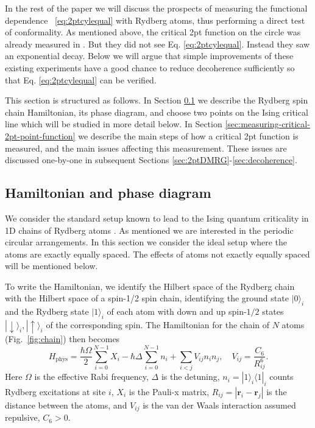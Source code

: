 \documentclass[a4paper,11pt]{article}
\theoremstyle{remark}
\theoremstyle{theorem}
\begin{document}
In the rest of the paper we will discuss the prospects of measuring the
functional dependence ~\eqref{eq:2ptcylequal} with Rydberg atoms, thus
performing a direct test of conformality. As mentioned above, the critical 2pt
function on the circle was already measured in
{\cite{Fang:2024uyf,Emperauger:2025raf}}. But they did not see Eq.
\eqref{eq:2ptcylequal}. Instead they saw an exponential decay. Below we will
argue that simple improvements of these existing experiments have a good
chance to reduce decoherence sufficiently so that Eq. \eqref{eq:2ptcylequal}
can be verified.

This section is structured as follows. In Section \ref{sec:hamiltonian-and-phase-diagram} we describe the Rydberg spin chain Hamiltonian, its phase diagram, and choose two points on the Ising critical line which will be studied in more detail below. In Section \ref{sec:measuring-critical-2pt-point-function} we describe the main steps of how a critical 2pt function is measured, and the main issues affecting this measurement. These issues are discussed one-by-one in subsequent Sections \ref{sec:2ptDMRG}-\ref{sec:decoherence}. 

\subsection{Hamiltonian and phase diagram}\label{sec:hamiltonian-and-phase-diagram}

We consider the standard setup known to lead to the Ising quantum criticality in
1D chains of Rydberg atoms {\cite[Eq.~(1)]{Browaeys:2020kzz}}. As mentioned we
are interested in the periodic circular arrangements. In this section we
consider the ideal setup where the atoms are exactly equally spaced. The
effects of atoms not exactly equally spaced will be mentioned below.

To write the Hamiltonian, we identify the Hilbert space of the Rydberg chain
with the Hilbert space of a spin-1/2 spin chain, identifying the ground state
$|0\rangle_i$ and the Rydberg state $|1\rangle_i$ of each atom with down and
up spin-$1 / 2$ states $|\!\!\downarrow\rangle_i, |\!\!\uparrow\rangle_i$ of the
corresponding spin. The Hamiltonian for the chain of $N$ atoms (Fig.~\ref{fig:chain}) then becomes
\begin{equation}
	H_{\text{phys}} = \frac{\hbar \Omega}{2}  \sum_{i = 0}^{N - 1} X_i -
	\hbar \Delta \sum_{i = 0}^{N - 1} n_i + \sum_{i < j} V_{ij} n_i n_j, \quad
	V_{ij} = \frac{C_6}{R_{ij}^6} . \label{eq:model}
\end{equation}
Here $\Omega$ is the effective Rabi frequency, $\Delta$ is the detuning, $n_i
= |1\rangle_i \langle 1|_i$ counts Rydberg excitations at site $i$, $X_i$ is
the Pauli-x matrix, $R_{ij} = | \mathbf{r}_i - \mathbf{r}_j |$ is the distance
between the atoms, and $V_{ij}$ is the van der Waals interaction assumed
repulsive, $C_6 > 0$.
\end{document}

